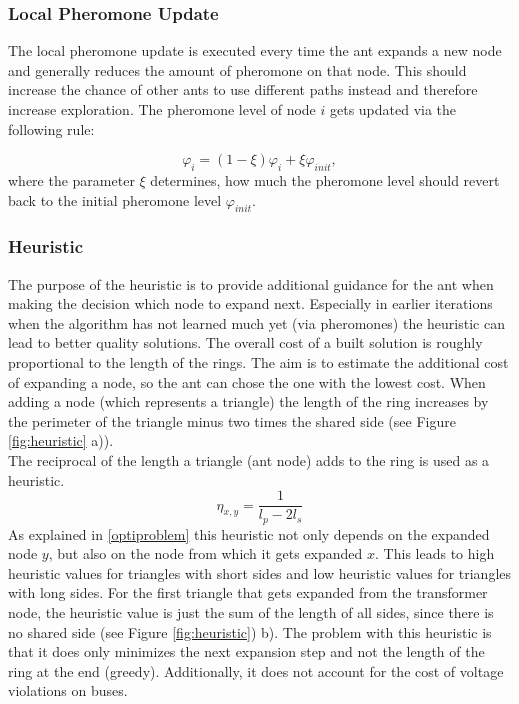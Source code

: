 \subsubsection{Local Pheromone Update}
The local pheromone update is executed every time the ant expands a new node and generally reduces the amount of pheromone on that node. This should increase the chance of other ants to use different paths instead and therefore increase exploration. The pheromone level of node $i$ gets updated via the following rule:

$$\varphi_i = (1-\xi)\varphi_i + \xi \varphi_{init},$$
where the parameter $\xi$ determines, how much the pheromone level should revert back to the initial pheromone level $\varphi_{init}$. 
\subsubsection{Heuristic}
The purpose of the heuristic is to provide additional guidance for the ant when making the decision which node to expand next. Especially in earlier iterations when the algorithm has not learned much yet (via pheromones) the heuristic can lead to better quality solutions. The overall cost of a built solution is roughly proportional to the length of the rings. The aim is to estimate the additional cost of expanding a node, so the ant can chose the one with the lowest cost. When adding a node (which represents a triangle) the length of the ring increases by the perimeter of the triangle minus two times the shared side (see Figure \ref{fig:heuristic} a)).
 \\
The reciprocal of the length a triangle (ant node) adds to the ring is used as a heuristic.
$$\eta_{x,y} = \frac{1}{l_{p} - 2l_{s}}$$
As explained in \ref{optiproblem} this heuristic not only depends on the expanded node $y$, but also on the node from which it gets expanded $x$. This leads to high heuristic values for triangles with short sides and low heuristic values for triangles with long sides. For the first triangle that gets expanded from the transformer node, the heuristic value is just the sum of the length of all sides, since there is no shared side (see Figure \ref{fig:heuristic}) b). The problem with this heuristic is that it does only minimizes the next expansion step and not the length of the ring at the end (greedy). Additionally, it does not account for the cost of voltage violations on buses.

